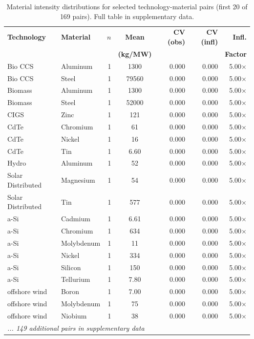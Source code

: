 \begin{table}[htbp]
\centering
\caption{Material intensity distributions for selected technology-material pairs (first 20 of 169 pairs). Full table in supplementary data.}
\label{tab:intensity_full_sample}
\footnotesize
\begin{tabular}{llrcrrr}
\toprule
\textbf{Technology} & \textbf{Material} & \textbf{$n$} & \textbf{Mean} & \textbf{CV (obs)} & \textbf{CV (infl)} & \textbf{Infl.} \\
& & & \textbf{(kg/MW)} & & & \textbf{Factor} \\
\midrule
Bio CCS & Aluminum & 1 & 1300 & 0.000 & 0.000 & 5.00× \\
Bio CCS & Steel & 1 & 79560 & 0.000 & 0.000 & 5.00× \\
Biomass & Aluminum & 1 & 1300 & 0.000 & 0.000 & 5.00× \\
Biomass & Steel & 1 & 52000 & 0.000 & 0.000 & 5.00× \\
CIGS & Zinc & 1 & 121 & 0.000 & 0.000 & 5.00× \\
CdTe & Chromium & 1 & 61 & 0.000 & 0.000 & 5.00× \\
CdTe & Nickel & 1 & 16 & 0.000 & 0.000 & 5.00× \\
CdTe & Tin & 1 & 6.60 & 0.000 & 0.000 & 5.00× \\
Hydro & Aluminum & 1 & 52 & 0.000 & 0.000 & 5.00× \\
Solar Distributed & Magnesium & 1 & 54 & 0.000 & 0.000 & 5.00× \\
Solar Distributed & Tin & 1 & 577 & 0.000 & 0.000 & 5.00× \\
a-Si & Cadmium & 1 & 6.61 & 0.000 & 0.000 & 5.00× \\
a-Si & Chromium & 1 & 634 & 0.000 & 0.000 & 5.00× \\
a-Si & Molybdenum & 1 & 11 & 0.000 & 0.000 & 5.00× \\
a-Si & Nickel & 1 & 334 & 0.000 & 0.000 & 5.00× \\
a-Si & Silicon & 1 & 150 & 0.000 & 0.000 & 5.00× \\
a-Si & Tellurium & 1 & 7.80 & 0.000 & 0.000 & 5.00× \\
offshore wind & Boron & 1 & 7.00 & 0.000 & 0.000 & 5.00× \\
offshore wind & Molybdenum & 1 & 75 & 0.000 & 0.000 & 5.00× \\
offshore wind & Niobium & 1 & 38 & 0.000 & 0.000 & 5.00× \\
\midrule
\multicolumn{7}{l}{\textit{... 149 additional pairs in supplementary data}} \\
\bottomrule
\end{tabular}
\end{table}
